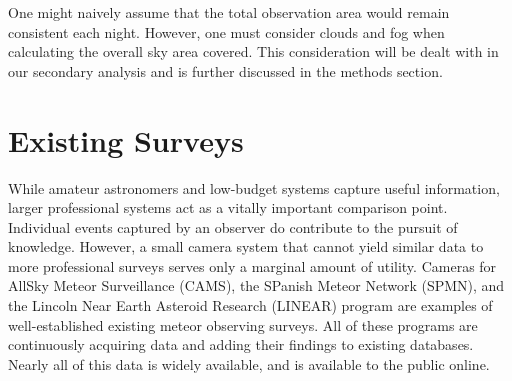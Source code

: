 One might naively assume that the total observation area would remain consistent each night.
However, one must consider clouds and fog when calculating the overall sky area covered.
This consideration will be dealt with in our secondary analysis and is further discussed in the methods section.


\section{Existing Surveys}
While amateur astronomers and low-budget systems capture useful information, larger professional systems act as a vitally important comparison point.
Individual events captured by an observer do contribute to the pursuit of knowledge.
However, a small camera system that cannot yield similar data to more professional surveys serves only a marginal amount of utility.
Cameras for AllSky Meteor Surveillance (CAMS), the SPanish Meteor Network (SPMN), and the Lincoln Near Earth Asteroid Research (LINEAR) program are examples of well-established existing meteor observing surveys. 
All of these programs are continuously acquiring data and adding their findings to existing databases.  
Nearly all of this data is widely available, and is available to the public online.



